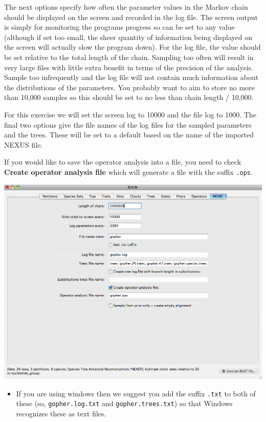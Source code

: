 \documentclass[12pt]{article}
\begin{document}
The next options specify how often the parameter values in the Markov
chain should be displayed on the screen and recorded in the log file.
The screen output is simply for monitoring the programs progress so
can be set to any value (although if set too small, the sheer quantity
of information being displayed on the screen will actually slow the
program down). For the log file, the value should be set relative
to the total length of the chain. Sampling too often will result in
very large files with little extra benefit in terms of the precision
of the analysis. Sample too infrequently and the log file will not
contain much information about the distributions of the parameters. 
You probably want to aim to store no more than 10,000 samples so this should be
set to no less than chain length / 10,000.

For this exercise we will set the screen log to 10000 and the file log to 1000. The final two
options give the file names of the log files for the sampled parameters and
the trees. These will be set to a default based on the name of the
imported NEXUS file. 

If you would like to save the operator analysis into a file, you need to check  \textbf{Create operator analysis file} which will generate a file with the suffix \texttt{.ops}. 

\medskip{}

\includegraphics[scale=0.4]{figures/BEAUti_MCMC}

\medskip{}

\begin{itemize}
\item If you are using windows then we suggest you add the suffix \texttt{.txt} to both of these (so,
\texttt{gopher.log.txt} and \texttt{gopher.trees.txt}) so that Windows recognizes
these as text files. 
\end{itemize}
\end{document}
